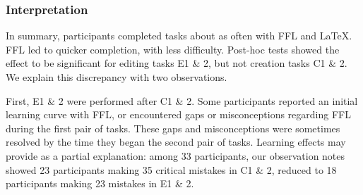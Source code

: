 


\subsubsection{Interpretation}

In summary, participants completed tasks about as often with FFL and LaTeX. FFL led to quicker completion, with less difficulty. Post-hoc tests showed the effect to be significant for editing tasks E1 \& 2, but not creation tasks C1 \& 2. We explain this discrepancy with two observations. 

First, E1 \& 2 were performed after C1 \& 2. Some participants reported an initial learning curve with FFL, or encountered gaps or misconceptions regarding FFL during the first pair of tasks. These gaps and misconceptions were sometimes resolved by the time they began the second pair of tasks. Learning effects may provide as a partial explanation: among 33 participants, our observation notes showed 23 participants making 35 critical mistakes  in C1 \& 2, reduced to 18 participants making 23 mistakes in E1 \& 2.

